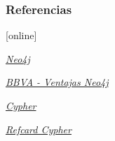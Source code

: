 \documentclass{beamer}
\begin{document}
\begin{frame}[allowframebreaks]
	\frametitle<presentation>{Referencias}

	\begin{thebibliography}{9}

		[online]

		{\em \href{https://neo4j.com/graphacademy/}{Neo4j}}

		{\em \href{https://bbvaopen4u.com/es/actualidad/neo4j-que-es-y-para-que-sirve-una-base-de-datos-orientada-grafos}{BBVA - Ventajas Neo4j}}

		{\em \href{https://neo4j.com/developer/cypher-query-language/}{Cypher}}

		{\em \href{https://neo4j.com/docs/cypher-refcard/current/}{Refcard Cypher}}

	\end{thebibliography}
\end{frame}
\end{document}
